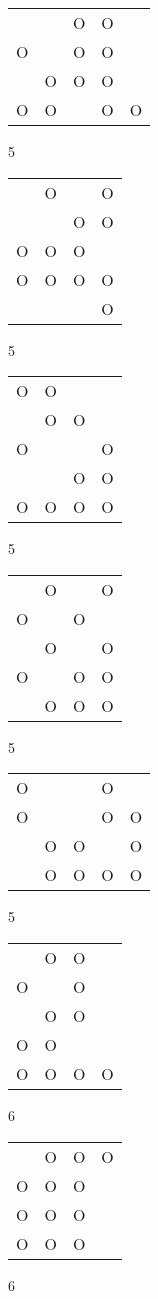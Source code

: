 \begin{tabular}{|m{0.2cm}m{0.2cm}m{0.2cm}m{0.2cm}m{0.2cm}|}\hline
 & &O&O& \\
O& &O&O& \\
 &O&O&O& \\
O&O& &O&O\\
\hline\end{tabular}5
\begin{tabular}{|m{0.2cm}m{0.2cm}m{0.2cm}m{0.2cm}|}\hline
 &O& &O\\
 & &O&O\\
O&O&O& \\
O&O&O&O\\
 & & &O\\
\hline\end{tabular}5
\begin{tabular}{|m{0.2cm}m{0.2cm}m{0.2cm}m{0.2cm}|}\hline
O&O& & \\
 &O&O& \\
O& & &O\\
 & &O&O\\
O&O&O&O\\
\hline\end{tabular}5
\begin{tabular}{|m{0.2cm}m{0.2cm}m{0.2cm}m{0.2cm}|}\hline
 &O& &O\\
O& &O& \\
 &O& &O\\
O& &O&O\\
 &O&O&O\\
\hline\end{tabular}5
\begin{tabular}{|m{0.2cm}m{0.2cm}m{0.2cm}m{0.2cm}m{0.2cm}|}\hline
O& & &O& \\
O& & &O&O\\
 &O&O& &O\\
 &O&O&O&O\\
\hline\end{tabular}5
\begin{tabular}{|m{0.2cm}m{0.2cm}m{0.2cm}m{0.2cm}|}\hline
 &O&O& \\
O& &O& \\
 &O&O& \\
O&O& & \\
O&O&O&O\\
\hline\end{tabular}6
\begin{tabular}{|m{0.2cm}m{0.2cm}m{0.2cm}m{0.2cm}|}\hline
 &O&O&O\\
O&O&O& \\
O&O&O& \\
O&O&O& \\
\hline\end{tabular}6
